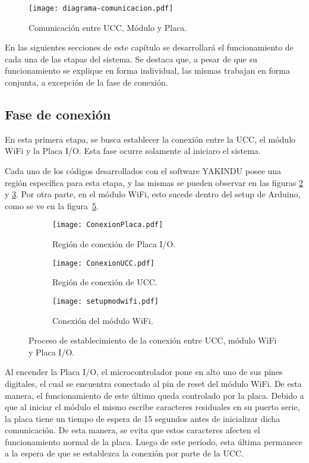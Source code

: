 \begin{figure}[H]
	\centering
	\texttt{[image: diagrama-comunicacion.pdf]}
	\caption{Comunicación entre UCC, Módulo y Placa.}
	\label{fig:img_diagrama-comunicacion}
\end{figure}

En las siguientes secciones de este capítulo se desarrollará el funcionamiento de cada una de las etapas del sistema.  Se destaca que, a pesar de que su funcionamiento se explique en forma individual, las mismas trabajan en forma conjunta, a excepción de la fase de conexión.
  

\subsection{Fase de conexión}

En esta primera etapa, se busca establecer la conexión entre la UCC, el módulo WiFi y la Placa I/O. Esta fase ocurre solamente al iniciaro el sistema.

Cada uno de los códigos desarrollados con el software YAKINDU posee una región específica para esta etapa, y las mismas se pueden observar en las figuras \ref{fig:img_ConexionPlaca} y \ref{fig:img_ConexionUCC}. Por otra parte, en el módulo WiFi, esto sucede dentro del setup de Arduino, como se ve en la figura~\ref{fig:img_setupmodwifi}. 

\begin{figure}[H]
	\centering
	\begin{subfigure}[b]{0.49\textwidth}
		\texttt{[image: ConexionPlaca.pdf]}
		\caption{Región de conexión de Placa I/O.}
		\label{fig:img_ConexionPlaca}
	\end{subfigure}
	\hfill
	\begin{subfigure}[b]{0.49\textwidth}
		\texttt{[image: ConexionUCC.pdf]}
		\caption{Región de conexión de UCC.}
		\label{fig:img_ConexionUCC}
	\end{subfigure}
	\hfill
	\begin{subfigure}[b]{0.49\textwidth}
		\texttt{[image: setupmodwifi.pdf]}
		\caption{Conexión del módulo WiFi.}
		\label{fig:img_setupmodwifi}
	\end{subfigure}
	\caption{Proceso de establecimiento de la conexión entre UCC, módulo WiFi y Placa I/O.}
\end{figure}

Al encender la Placa I/O, el microcontrolador pone en alto uno de sus pines digitales, el cual se encuentra conectado al pin de reset del módulo WiFi. De esta manera, el funcionamiento de este último queda controlado por la placa. Debido a que al iniciar el módulo el mismo escribe caracteres residuales en su puerto serie, la placa tiene un tiempo de espera de 15 segundos antes de inicializar dicha comunicación. De esta manera, se evita que estos caracteres afecten el funcionamiento normal de la placa. Luego de este período, esta última permanece a la espera de que se establezca la conexión por parte de la UCC.

